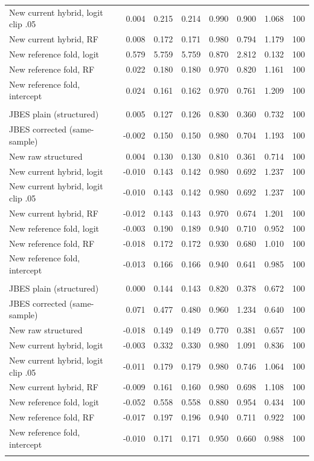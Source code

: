 {\begin{longtable}{lrrrrrrr}
\quad New current hybrid, logit clip .05 & 0.004 & 0.215 & 0.214 & 0.990 & 0.900 & 1.068 & 100 \\
\quad New current hybrid, RF & 0.008 & 0.172 & 0.171 & 0.980 & 0.794 & 1.179 & 100 \\
\quad New reference fold, logit & 0.579 & 5.759 & 5.759 & 0.870 & 2.812 & 0.132 & 100 \\
\quad New reference fold, RF & 0.022 & 0.180 & 0.180 & 0.970 & 0.820 & 1.161 & 100 \\
\quad New reference fold, intercept & 0.024 & 0.161 & 0.162 & 0.970 & 0.761 & 1.209 & 100 \\
\addlinespace
\multicolumn{8}{l}{\textit{serial, degree $d=1$}} \\
\quad JBES plain (structured) & 0.005 & 0.127 & 0.126 & 0.830 & 0.360 & 0.732 & 100 \\
\quad JBES corrected (same-sample) & -0.002 & 0.150 & 0.150 & 0.980 & 0.704 & 1.193 & 100 \\
\quad New raw structured & 0.004 & 0.130 & 0.130 & 0.810 & 0.361 & 0.714 & 100 \\
\quad New current hybrid, logit & -0.010 & 0.143 & 0.142 & 0.980 & 0.692 & 1.237 & 100 \\
\quad New current hybrid, logit clip .05 & -0.010 & 0.143 & 0.142 & 0.980 & 0.692 & 1.237 & 100 \\
\quad New current hybrid, RF & -0.012 & 0.143 & 0.143 & 0.970 & 0.674 & 1.201 & 100 \\
\quad New reference fold, logit & -0.003 & 0.190 & 0.189 & 0.940 & 0.710 & 0.952 & 100 \\
\quad New reference fold, RF & -0.018 & 0.172 & 0.172 & 0.930 & 0.680 & 1.010 & 100 \\
\quad New reference fold, intercept & -0.013 & 0.166 & 0.166 & 0.940 & 0.641 & 0.985 & 100 \\
\addlinespace
\multicolumn{8}{l}{\textit{serial, degree $d=2$}} \\
\quad JBES plain (structured) & 0.000 & 0.144 & 0.143 & 0.820 & 0.378 & 0.672 & 100 \\
\quad JBES corrected (same-sample) & 0.071 & 0.477 & 0.480 & 0.960 & 1.234 & 0.640 & 100 \\
\quad New raw structured & -0.018 & 0.149 & 0.149 & 0.770 & 0.381 & 0.657 & 100 \\
\quad New current hybrid, logit & -0.003 & 0.332 & 0.330 & 0.980 & 1.091 & 0.836 & 100 \\
\quad New current hybrid, logit clip .05 & -0.011 & 0.179 & 0.179 & 0.980 & 0.746 & 1.064 & 100 \\
\quad New current hybrid, RF & -0.009 & 0.161 & 0.160 & 0.980 & 0.698 & 1.108 & 100 \\
\quad New reference fold, logit & -0.052 & 0.558 & 0.558 & 0.880 & 0.954 & 0.434 & 100 \\
\quad New reference fold, RF & -0.017 & 0.197 & 0.196 & 0.940 & 0.711 & 0.922 & 100 \\
\quad New reference fold, intercept & -0.010 & 0.171 & 0.171 & 0.950 & 0.660 & 0.988 & 100 \\
\addlinespace
\end{longtable}
}

